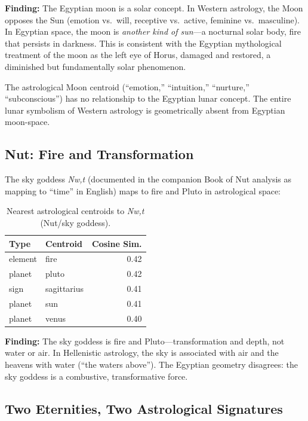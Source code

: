 \documentclass[11pt, a4paper]{article}
\begin{document}
{\color{insight}\textbf{Finding:}} The Egyptian moon is a solar concept. In Western astrology, the Moon opposes the Sun (emotion vs.\ will, receptive vs.\ active, feminine vs.\ masculine). In Egyptian space, the moon is \textit{another kind of sun}---a nocturnal solar body, fire that persists in darkness. This is consistent with the Egyptian mythological treatment of the moon as the left eye of Horus, damaged and restored, a diminished but fundamentally solar phenomenon.

The astrological Moon centroid (``emotion,'' ``intuition,'' ``nurture,'' ``subconscious'') has no relationship to the Egyptian lunar concept. The entire lunar symbolism of Western astrology is geometrically absent from Egyptian moon-space.

\subsection{Nut: Fire and Transformation}

The sky goddess \textit{Nw,t} (documented in the companion Book of Nut analysis as mapping to ``time'' in English) maps to fire and Pluto in astrological space:

\begin{table}[H]
\centering
\begin{tabular}{llr}
\toprule
\textbf{Type} & \textbf{Centroid} & \textbf{Cosine Sim.} \\
\midrule
element & fire & 0.42 \\
planet & pluto & 0.42 \\
sign & sagittarius & 0.41 \\
planet & sun & 0.41 \\
planet & venus & 0.40 \\
\bottomrule
\end{tabular}
\caption{Nearest astrological centroids to \textit{Nw,t} (Nut/sky goddess).}
\end{table}

{\color{insight}\textbf{Finding:}} The sky goddess is fire and Pluto---transformation and depth, not water or air. In Hellenistic astrology, the sky is associated with air and the heavens with water (``the waters above''). The Egyptian geometry disagrees: the sky goddess is a combustive, transformative force.

\subsection{Two Eternities, Two Astrological Signatures}
\end{document}
